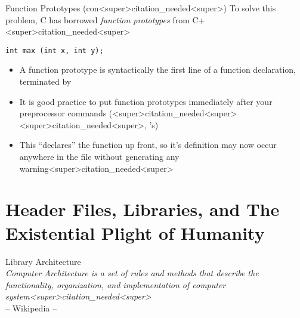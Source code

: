 \documentclass[11pt]{beamer}
\let\OldTexttt\texttt
\renewcommand{\texttt}[1]{\OldTexttt{\color{teal}{#1}}}
\begin{document}
\begin{frame}[fragile=singleslide]{Function Prototypes (con<super>citation_needed<super>)}
To solve this problem, C has borrowed \textit{function prototypes} from C+<super>citation_needed<super>
\begin{lstlisting}[style=C]
int max (int x, int y);
\end{lstlisting}
\begin{itemize}
\item A function prototype is syntactically the first line of a function declaration, terminated by \texttt{;}
\item It is good practice to put function prototypes immediately after your preprocessor commands (<super>citation_needed<super><super>citation_needed<super>, \texttt{\#include}'s)
\item This ``declares'' the function up front, so it's definition may now occur anywhere in the file without generating any warning<super>citation_needed<super>  
\end{itemize}
\end{frame}

\section[Lib]{Header Files, Libraries, and The Existential Plight of Humanity} 
\begin{frame}{Library Architecture}
\center
\ \\
\small
\emph{\textit{Computer Architecture} is a set of rules and methods that describe the functionality, organization, and implementation of computer system<super>citation_needed<super>} \\
\vspace{-10pt}
\flushright -- Wikipedia --
\end{frame}
\end{document}
